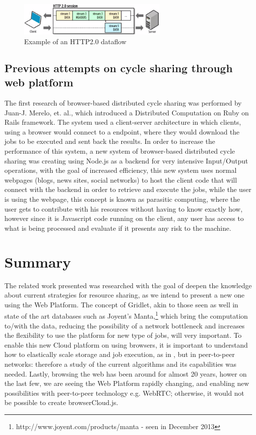 \begin{figure}[h!]
  \centering
  \includegraphics[width=0.65\textwidth]{img/http2dataflow.png}
  \caption{Example of an HTTP2.0 dataflow}
  \label{fig:http2dataflow}
\end{figure}

\subsection{Previous attempts on cycle sharing through web platform}
The first research of browser-based distributed cycle sharing was performed by Juan-J. Merelo, et. al., which introduced a Distributed Computation on Ruby on Rails framework\cite{Merelo2007}. The system used a client-server architecture in which clients, using a browser would connect to a endpoint, where they would download the jobs to be executed and sent back the results. In order to increase the performance of this system, a new system\cite{Duda2013} of browser-based distributed cycle sharing was creating using Node.js as a backend for very intensive Input/Output operations\cite{Tilkov2010}, with the goal of increased efficiency, this new system uses normal webpages (blogs, news sites, social networks) to host the client code that will connect with the backend in order to retrieve and execute the jobs, while the user is using the webpage, this concept is known as parasitic computing\cite{Barabasi2001}, where the user gets to contribute with his resources without having to know exactly how, however since it is Javascript code running on the client, any user has access to what is being processed and evaluate if it presents any risk to the machine.

\section{Summary}

The related work presented was researched with the goal of deepen the knowledge about current strategies for resource sharing, as we intend to present a new one using the Web Platform. The concept of Gridlet, akin to those seen as well in state of the art databases such as Joyent's Manta,\footnote{http://www.joyent.com/products/manta - seen in December 2013} which bring the computation to/with the data, reducing the possibility of a network bottleneck and increases the flexibility to use the platform for new type of jobs, will very important. To enable this new Cloud platform on using browsers, it is important to understand how to elastically scale storage and job execution, as in \cite{Silva2011}, but in peer-to-peer networks: therefore a study of the current algorithms and its capabilities was needed. Lastly, browsing the web has been around for almost 20 years, hower on the last few, we are seeing the Web Platform rapidly changing, and enabling new possibilities with peer-to-peer technology e.g. WebRTC; otherwise, it would not be possible to create browserCloud.js.
